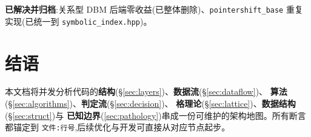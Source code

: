 \documentclass[11pt]{ctexart}
\newcommand{\code}[1]{\texttt{#1}}
\begin{document}
\textbf{已解决并归档}:关系型 DBM 后端零收益(已整体删除)、\code{pointershift\_base} 重复实现(已统一到
\code{symbolic\_index.hpp})。

\section*{结语}

本文档将并发分析代码的\textbf{结构}(§\ref{sec:layers})、\textbf{数据流}(§\ref{sec:dataflow})、
\textbf{算法}(§\ref{sec:algorithms})、\textbf{判定流}(§\ref{sec:decision})、
\textbf{格理论}(§\ref{sec:lattice})、\textbf{数据结构}(§\ref{sec:struct})与
\textbf{已知边界}(\ref{sec:pathology})串成一份可维护的架构地图。所有断言都锚定到
\code{文件:行号},后续优化与开发可直接从对应节点起步。
\end{document}
